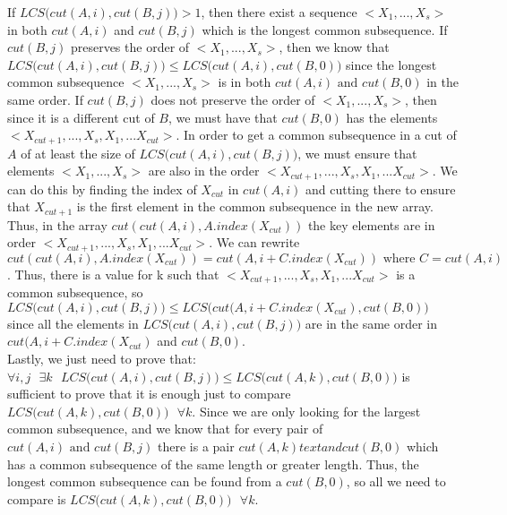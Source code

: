 \documentclass[12pt]{article}
\begin{document}
\begin{enumerate}[label=(\alph*)]
    If $LCS\big(cut(A,i), cut(B,j)\big) > 1$, then there exist a sequence $<X_1,...,X_s>$ in both $cut(A,i)$ and $cut(B,j)$ which is the longest common subsequence. If $cut(B,j)$ preserves the order of $<X_1,...,X_s>$, then we know that $LCS\big(cut(A,i), cut(B,j)\big) \le LCS\big(cut(A,i), cut(B,0)\big)$ since the longest common subsequence $<X_1,...,X_s>$ is in both $cut(A,i) \text{ and } cut(B,0)$ in the same order. If $cut(B,j)$ does not preserve the order of $<X_1,...,X_s>$, then since it is a different cut of $B$, we must have that $cut(B,0)$ has the elements $<X_{cut+1},...,X_s,X_1,...X_{cut}>$. In order to get a common subsequence in a cut of $A$ of at least the size of $LCS\big(cut(A,i), cut(B,j)\big)$, we must ensure that elements $<X_1,...,X_s>$ are also in the order $<X_{cut+1},...,X_s,X_1,...X_{cut}>$. We can do this by finding the index of $X_{cut}$ in $cut(A,i)$ and cutting there to ensure that $X_{cut+1}$ is the first element in the common subsequence in the new array. Thus, in the array $cut(cut(A,i),A.index(X_{cut}))$ the key elements are in order $<X_{cut+1},...,X_s,X_1,...X_{cut}>$. We can rewrite $cut(cut(A,i),A.index(X_{cut})) = cut(A,i+C.index(X_{cut})) \text{ where } C = cut(A,i)$. Thus, there is a value for k such that $<X_{cut+1},...,X_s,X_1,...X_{cut}>$ is a common subsequence, so $LCS\big(cut(A,i), cut(B,j)\big) \le LCS\big(cut(A,i+C.index(X_{cut}), cut(B,0)\big)$ since all the elements in $LCS\big(cut(A,i), cut(B,j)\big)$ are in the same order in $cut(A,i+C.index(X_{cut})$ and $cut(B,0)$.\\
    Lastly, we just need to prove that:\\
     $\forall i,j \text{ } \exists k \text{ } LCS\big(cut(A,i), cut(B,j)\big) \le LCS\big(cut(A,k), cut(B,0)\big)$ is sufficient to prove that it is enough just to compare $LCS\big(cut(A,k), cut(B,0)\big)\text{ }\forall k$. Since we are only looking for the largest common subsequence, and we know that for every pair of $cut(A,i) \text{ and } cut(B,j)$ there is a pair $cut(A,k) text{ and } cut(B,0)$ which has a common subsequence of the same length or greater length. Thus, the longest common subsequence can be found from a $cut(B,0)$, so all we need to compare is $LCS\big(cut(A,k), cut(B,0)\big)\text{ }\forall k$.
    

\end{enumerate}
\end{document}
